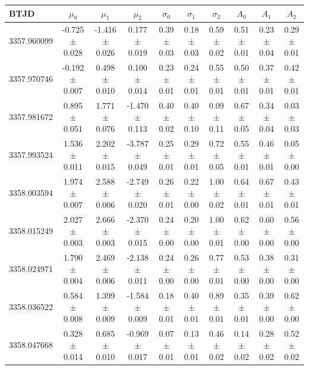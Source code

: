 \documentclass{nature3}
\newcommand{\kms}{\ensuremath{\rm km\,s^{-1}}}
\begin{document}
\begin{methods}
\begin{table}
  \footnotesize
  \centering
  \begin{tabular}{lccccccccc}
  \hline
  BTJD & $\mu_0$ & $\mu_1$ & $\mu_2$ & $\sigma_0$ & $\sigma_1$ & $\sigma_2$ & $A_0$ & $A_1$ & $A_2$ \\
  \hline
  3357.960099 & -0.725 $\pm$ 0.028 & -1.416 $\pm$ 0.026 & 0.177 $\pm$ 0.019 & 0.39 $\pm$ 0.03 & 0.18 $\pm$ 0.03 & 0.59 $\pm$ 0.02 & 0.51 $\pm$ 0.01 & 0.23 $\pm$ 0.04 & 0.29 $\pm$ 0.01 \\
  3357.970746 & -0.192 $\pm$ 0.007 & 0.498 $\pm$ 0.010 & 0.100 $\pm$ 0.014 & 0.23 $\pm$ 0.01 & 0.24 $\pm$ 0.01 & 0.55 $\pm$ 0.01 & 0.50 $\pm$ 0.01 & 0.37 $\pm$ 0.01 & 0.42 $\pm$ 0.01 \\
  3357.981672 & 0.895 $\pm$ 0.051 & 1.771 $\pm$ 0.076 & -1.470 $\pm$ 0.113 & 0.40 $\pm$ 0.02 & 0.40 $\pm$ 0.10 & 0.09 $\pm$ 0.11 & 0.67 $\pm$ 0.05 & 0.34 $\pm$ 0.04 & 0.03 $\pm$ 0.03 \\
  3357.993524 & 1.536 $\pm$ 0.011 & 2.202 $\pm$ 0.015 & -3.787 $\pm$ 0.049 & 0.25 $\pm$ 0.01 & 0.29 $\pm$ 0.01 & 0.72 $\pm$ 0.05 & 0.55 $\pm$ 0.01 & 0.46 $\pm$ 0.01 & 0.05 $\pm$ 0.00 \\
  3358.003594 & 1.974 $\pm$ 0.007 & 2.588 $\pm$ 0.006 & -2.749 $\pm$ 0.020 & 0.26 $\pm$ 0.01 & 0.22 $\pm$ 0.00 & 1.00 $\pm$ 0.02 & 0.64 $\pm$ 0.01 & 0.67 $\pm$ 0.01 & 0.43 $\pm$ 0.01 \\
  3358.015249 & 2.027 $\pm$ 0.003 & 2.666 $\pm$ 0.003 & -2.370 $\pm$ 0.015 & 0.24 $\pm$ 0.00 & 0.20 $\pm$ 0.00 & 1.00 $\pm$ 0.01 & 0.62 $\pm$ 0.00 & 0.60 $\pm$ 0.00 & 0.56 $\pm$ 0.00 \\
  3358.024971 & 1.790 $\pm$ 0.004 & 2.469 $\pm$ 0.006 & -2.138 $\pm$ 0.011 & 0.24 $\pm$ 0.00 & 0.26 $\pm$ 0.00 & 0.77 $\pm$ 0.01 & 0.53 $\pm$ 0.00 & 0.38 $\pm$ 0.00 & 0.31 $\pm$ 0.00 \\
  3358.036522 & 0.584 $\pm$ 0.008 & 1.399 $\pm$ 0.009 & -1.584 $\pm$ 0.009 & 0.18 $\pm$ 0.01 & 0.40 $\pm$ 0.01 & 0.89 $\pm$ 0.01 & 0.35 $\pm$ 0.01 & 0.39 $\pm$ 0.00 & 0.62 $\pm$ 0.00 \\
  3358.047668 & 0.328 $\pm$ 0.014 & 0.685 $\pm$ 0.010 & -0.969 $\pm$ 0.017 & 0.07 $\pm$ 0.01 & 0.13 $\pm$ 0.01 & 0.46 $\pm$ 0.02 & 0.14 $\pm$ 0.02 & 0.28 $\pm$ 0.02 & 0.52 $\pm$ 0.02 \\

\end{tabular}
\end{table}
\end{methods}
\end{document}
